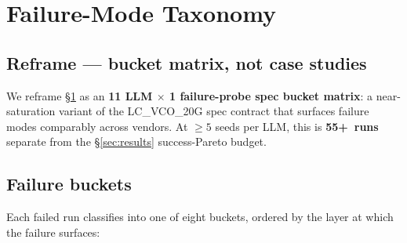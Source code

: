 
\section{Failure-Mode Taxonomy}
\label{sec:failures}

\subsection{Reframe --- bucket matrix, not case studies}
\label{sec:failures-reframe}

We reframe \S\ref{sec:failures} as an \textbf{11 LLM $\times$ 1
failure-probe spec bucket matrix}: a near-saturation variant of
the LC\_VCO\_20G spec contract that surfaces failure modes
comparably across vendors. At $\geq 5$ seeds per LLM, this is
\textbf{55+~runs} separate from the \S\ref{sec:results}
success-Pareto budget.

\subsection{Failure buckets}
\label{sec:failures-buckets}

Each failed run classifies into one of eight buckets, ordered by
the layer at which the failure surfaces:

